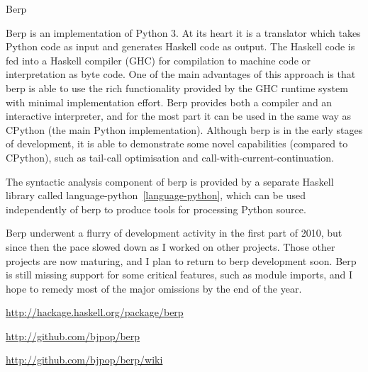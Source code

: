 \begin{hcarentry}[new]{Berp}
\label{berp}
\makeheader

Berp is an implementation of Python 3. At its heart it is a translator
which takes Python code as input and generates Haskell code as output.
The Haskell code is fed into a Haskell compiler (GHC) for compilation
to machine code or interpretation as byte code. One of the main advantages
of this approach is that berp is able to use the rich
functionality provided by the GHC runtime system with minimal
implementation effort.
Berp provides both a compiler and an interactive interpreter, and for the
most part it can be used in the same way as CPython (the main Python
implementation). Although berp is in the early stages of development,
it is able to demonstrate some novel capabilities (compared to CPython),
such as tail-call optimisation and call-with-current-continuation.

The syntactic analysis component of berp is provided by a separate Haskell
library called language-python~\cref{language-python}, which can be used independently of berp to
produce tools for processing Python source.

Berp underwent a flurry of development activity in the first part of 2010,
but since then the pace slowed down as I worked on other projects.
Those other projects are now maturing, and I plan to return
to berp development soon. Berp is still missing support
for some critical features, such as module imports, and I hope to
remedy most of the major omissions by the end of the year.

\FurtherReading
\begin{compactitem}
\item \url{http://hackage.haskell.org/package/berp}
\item \url{http://github.com/bjpop/berp}
\item \url{http://github.com/bjpop/berp/wiki}
\end{compactitem}
\end{hcarentry}
